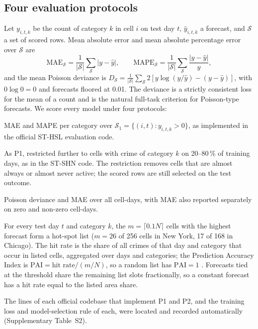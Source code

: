 \documentclass[preprint,12pt,authoryear]{elsarticle}
\begin{document}
\subsection{Four evaluation protocols}\label{sec:protocols}
Let $y_{i,t,k}$ be the count of category $k$ in cell $i$ on test day $t$, $\hat y_{i,t,k}$ a forecast, and $\mathcal{S}$ a set of scored rows. Mean absolute error and mean absolute percentage error over $\mathcal{S}$ are
\begin{equation}
\mathrm{MAE}_{\mathcal{S}}=\frac{1}{|\mathcal{S}|}\sum_{\mathcal{S}}|y-\hat y|,\qquad \mathrm{MAPE}_{\mathcal{S}}=\frac{1}{|\mathcal{S}|}\sum_{\mathcal{S}}\frac{|y-\hat y|}{y},
\end{equation}
and the mean Poisson deviance is $D_{\mathcal{S}}=\frac{1}{|\mathcal{S}|}\sum_{\mathcal{S}}2\left[y\log(y/\hat y)-(y-\hat y)\right]$, with $0\log0=0$ and forecasts floored at 0.01. The deviance is a strictly consistent loss for the mean of a count and is the natural full-task criterion for Poisson-type forecasts. We score every model under four protocols:
\begin{description}[leftmargin=1em,style=nextline,itemsep=2pt]
\item[P1 (official, ST-HSL).] MAE and MAPE per category over $\mathcal{S}_1=\{(i,t): y_{i,t,k}>0\}$, as implemented in the official ST-HSL evaluation code.
\item[P2 (official, ST-SHN).] As P1, restricted further to cells with crime of category $k$ on 20--80\,\% of training days, as in the ST-SHN code. The restriction removes cells that are almost always or almost never active; the scored rows are still selected on the test outcome.
\item[P3 (full).] Poisson deviance and MAE over all cell-days, with MAE also reported separately on zero and non-zero cell-days.
\item[P4 (decision).] For every test day $t$ and category $k$, the $m=\lceil0.1N\rceil$ cells with the highest forecast form a hot-spot list ($m=26$ of 256 cells in New York, 17 of 168 in Chicago). The hit rate is the share of all crimes of that day and category that occur in listed cells, aggregated over days and categories; the Prediction Accuracy Index is $\mathrm{PAI}=\text{hit rate}/(m/N)$, so a random list has $\mathrm{PAI}=1$ \citep{chainey2008utility}. Forecasts tied at the threshold share the remaining list slots fractionally, so a constant forecast has a hit rate equal to the listed area share.
\end{description}
The lines of each official codebase that implement P1 and P2, and the training loss and model-selection rule of each, were located and recorded automatically (Supplementary Table~S2).
\end{document}
